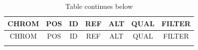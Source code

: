 \documentclass[]{book}
\theoremstyle{definition}
\theoremstyle{definition}
\theoremstyle{definition}
\theoremstyle{remark}
\begin{document}
\begin{longtable}[]{@{}ccccccc@{}}
\caption{Table continues below}\tabularnewline
\toprule
\begin{minipage}[b]{0.09\columnwidth}\centering
CHROM\strut
\end{minipage} & \begin{minipage}[b]{0.09\columnwidth}\centering
POS\strut
\end{minipage} & \begin{minipage}[b]{0.13\columnwidth}\centering
ID\strut
\end{minipage} & \begin{minipage}[b]{0.07\columnwidth}\centering
REF\strut
\end{minipage} & \begin{minipage}[b]{0.07\columnwidth}\centering
ALT\strut
\end{minipage} & \begin{minipage}[b]{0.08\columnwidth}\centering
QUAL\strut
\end{minipage} & \begin{minipage}[b]{0.10\columnwidth}\centering
FILTER\strut
\end{minipage}\tabularnewline
\midrule
\endfirsthead
\toprule
\begin{minipage}[b]{0.09\columnwidth}\centering
CHROM\strut
\end{minipage} & \begin{minipage}[b]{0.09\columnwidth}\centering
POS\strut
\end{minipage} & \begin{minipage}[b]{0.13\columnwidth}\centering
ID\strut
\end{minipage} & \begin{minipage}[b]{0.07\columnwidth}\centering
REF\strut
\end{minipage} & \begin{minipage}[b]{0.07\columnwidth}\centering
ALT\strut
\end{minipage} & \begin{minipage}[b]{0.08\columnwidth}\centering
QUAL\strut
\end{minipage} & \begin{minipage}[b]{0.10\columnwidth}\centering
FILTER\strut
\end{minipage}\tabularnewline
\midrule
\endhead
\begin{minipage}[t]{0.09\columnwidth}\centering
20\strut
\end{minipage} & \begin{minipage}[t]{0.09\columnwidth}\centering

\end{minipage}
\end{longtable}
\end{document}
